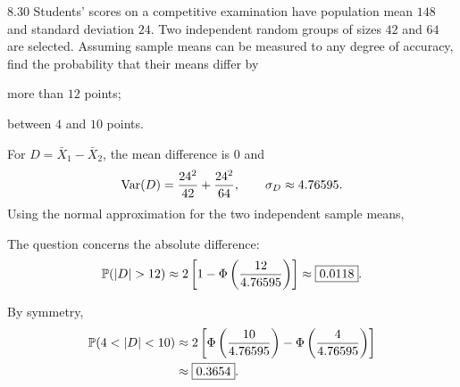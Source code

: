 \documentclass[11pt,oneside]{article}
\begin{document}
\begin{exercise}{8.30}
Students' scores on a competitive examination have population mean $148$ and standard deviation $24$. Two independent random groups of sizes $42$ and $64$ are selected. Assuming sample means can be measured to any degree of accuracy, find the probability that their means differ by
\begin{exercisesubparts}
\item more than $12$ points;
\item between $4$ and $10$ points.
\end{exercisesubparts}
\end{exercise}
\begin{solution}
For $D=\bar X_1-\bar X_2$, the mean difference is $0$ and
\[
\operatorname{Var}(D)=\frac{24^2}{42}+\frac{24^2}{64}, \qquad
\sigma_D\approx4.76595.
\]
Using the normal approximation for the two independent sample means,
\begin{exercisesubparts}
\item The question concerns the absolute difference:
\[
\Prob(|D|>12)\approx2\left[1-\Phi\left(\frac{12}{4.76595}\right)\right]
\approx\boxed{0.0118}.
\]
\item By symmetry,
\[
\begin{aligned}
\Prob(4<|D|<10)
&\approx2\left[\Phi\left(\frac{10}{4.76595}\right)
-\Phi\left(\frac{4}{4.76595}\right)\right]\\
&\approx\boxed{0.3654}.
\end{aligned}
\]
\end{exercisesubparts}
\end{solution}
\end{document}
